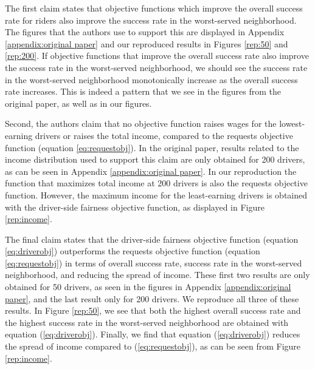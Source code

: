 The first claim states that objective functions which improve the overall success rate for riders also improve the success rate in the worst-served neighborhood. The figures that the authors use to support this are displayed in Appendix \ref{appendix:original paper} and our reproduced results in Figures \ref{rep:50} and \ref{rep:200}. If objective functions that improve the overall success rate also improve the success rate in the worst-served neighborhood, we should see the success rate in the worst-served neighborhood monotonically increase as the overall success rate increases. This is indeed a pattern that we see in the figures from the original paper, as well as in our figures.

Second, the authors claim that no objective function raises wages for the lowest-earning drivers or raises the total income, compared to the requests objective function (equation \ref{eq:requestobj}). In the original paper, results related to the income distribution used to support this claim are only obtained for 200 drivers, as can be seen in Appendix \ref{appendix:original paper}. In our reproduction the function that maximizes total income at 200 drivers is also the requests objective function. However, the maximum income for the least-earning drivers is obtained with the driver-side fairness objective function, as displayed in Figure \ref{rep:income}.

The final claim states that the driver-side fairness objective function (equation \ref{eq:driverobj}) outperforms the requests objective function (equation \ref{eq:requestobj}) in terms of overall success rate, success rate in the worst-served neighborhood, and reducing the spread of income. These first two results are only obtained for 50 drivers, as seen in the figures in Appendix \ref{appendix:original paper}, and the last result only for 200 drivers. We reproduce all three of these results. In Figure \ref{rep:50}, we see that both the highest overall success rate and the highest success rate in the worst-served neighborhood are obtained with equation (\ref{eq:driverobj}). Finally, we find that equation (\ref{eq:driverobj}) reduces the spread of income compared to (\ref{eq:requestobj}), as can be seen from Figure \ref{rep:income}.

